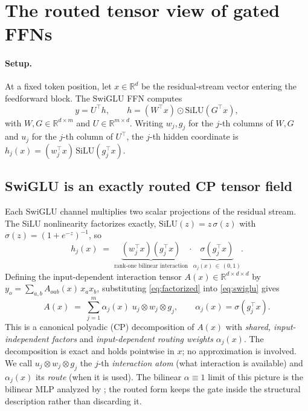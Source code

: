 \documentclass[11pt]{article}
\newcommand{\R}{\mathbb{R}}
\newcommand{\silu}{\mathrm{SiLU}}
\newcommand{\T}{^{\top}}
\begin{document}
\section{The routed tensor view of gated FFNs}
\label{sec:theory}

\paragraph{Setup.}
At a fixed token position, let $x \in \R^d$ be the residual-stream vector entering the
feedforward block. The SwiGLU FFN \citep{shazeer2020glu} computes
\begin{equation}
\label{eq:swiglu}
y = U\T h, \qquad h = (W\T x) \odot \silu(G\T x),
\end{equation}
with $W, G \in \R^{d\times m}$ and $U \in \R^{m \times d}$. Writing $w_j, g_j$ for the
$j$-th columns of $W, G$ and $u_j$ for the $j$-th column of $U\T$, the $j$-th hidden
coordinate is $h_j(x) = (w_j\T x)\,\silu(g_j\T x)$.

\subsection{SwiGLU is an exactly routed CP tensor field}
\label{sec:routedcp}

Each SwiGLU channel multiplies two scalar projections of the residual stream. The SiLU
nonlinearity factorizes exactly, $\silu(z) = z\,\sigma(z)$ with
$\sigma(z) = (1+e^{-z})^{-1}$, so
\begin{equation}
\label{eq:factorized}
h_j(x) \;=\; \underbrace{(w_j\T x)(g_j\T x)}_{\text{rank-one bilinear interaction}}
\cdot \underbrace{\sigma(g_j\T x)}_{\alpha_j(x)\,\in\,(0,1)} .
\end{equation}
Defining the input-dependent interaction tensor $A(x) \in \R^{d\times d\times d}$ by
$y_o = \sum_{a,b} A_{oab}(x)\, x_a x_b$, substituting \eqref{eq:factorized} into
\eqref{eq:swiglu} gives
\begin{equation}
\label{eq:cp}
A(x) \;=\; \sum_{j=1}^{m} \alpha_j(x)\; u_j \otimes w_j \otimes g_j ,
\qquad \alpha_j(x) = \sigma(g_j\T x).
\end{equation}
This is a canonical polyadic (CP) decomposition \citep{kolda2009tensor} of $A(x)$ with
\emph{shared, input-independent factors} and \emph{input-dependent routing weights}
$\alpha_j(x)$. The decomposition is exact and holds pointwise in $x$; no approximation
is involved. We call $u_j \otimes w_j \otimes g_j$ the $j$-th \emph{interaction atom}
(what interaction is available) and $\alpha_j(x)$ its \emph{route} (when it is used).
The bilinear $\alpha\equiv 1$ limit of this picture is the bilinear MLP analyzed by
\citet{pearce2025bilinear}; the routed form keeps the gate inside the structural
description rather than discarding it.
\end{document}
